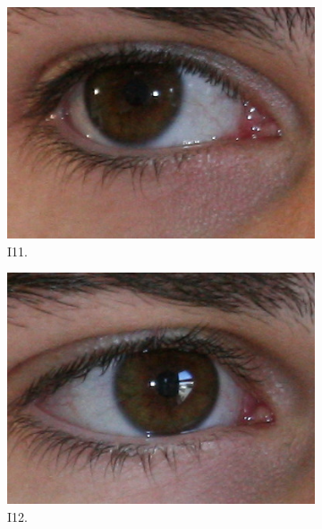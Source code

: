 \begin{figure}[htb]
    \centering %
\begin{subfigure}{0.25\textwidth}
  \includegraphics[width=\linewidth]{img/Resultados/ubirisv2/C3_S1_I11.jpg}
  \caption{I11.}
\end{subfigure}\hfil %
\begin{subfigure}{0.25\textwidth}
  \includegraphics[width=\linewidth]{img/Resultados/ubirisv2/C3_S1_I12.jpg}
  \caption{I12.}
  \label{fig:2}
\end{subfigure}\hfil %
\begin{subfigure}{0.25\textwidth}

\end{subfigure}
\end{figure}
